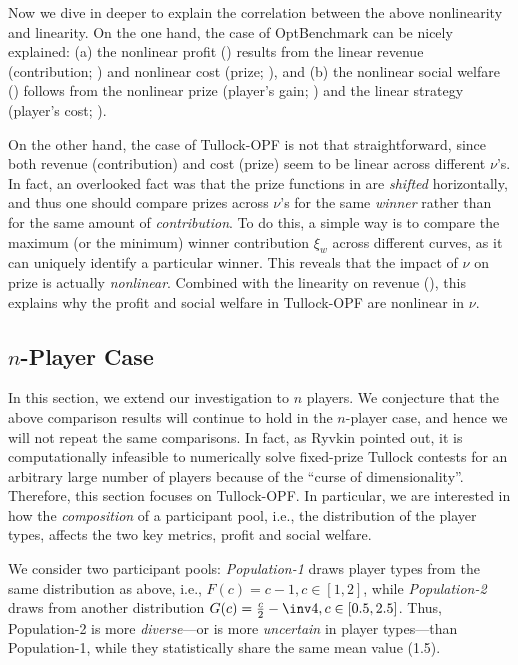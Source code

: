 \documentclass{sig-alternate-10pt}
\begin{document}
Now we dive in deeper to explain the correlation between the above nonlinearity and linearity. On the one hand, the case of OptBenchmark can be nicely explained: (a) the nonlinear profit () results from the linear revenue (contribution; ) and nonlinear cost (prize; ), and (b) the nonlinear social welfare () follows from the nonlinear prize (player's gain; ) and the linear strategy (player's cost; ).

On the other hand, the case of Tullock-OPF is not that straightforward, since both revenue (contribution) and cost (prize) seem to be linear across different $\nu$'s. In fact, an overlooked fact was that the prize functions in  are {\em shifted} horizontally, and thus one should compare prizes across $\nu$'s for the same {\em winner} rather than for the same amount of {\em contribution}. To do this, a simple way is to compare the maximum (or the minimum) winner contribution $\xi_w$ across different curves, as it can uniquely identify a particular winner. This reveals that the impact of $\nu$ on prize is actually {\em nonlinear}. Combined with the linearity on revenue (), this explains why the profit and social welfare in Tullock-OPF are nonlinear in $\nu$. 

\subsection{$n$-Player Case}

In this section, we extend our investigation to $n$ players. We conjecture that the above comparison results will continue to hold in the $n$-player case, and hence we will not repeat the same comparisons. In fact, as Ryvkin \cite{Ryvkin10} pointed out, it is computationally infeasible to numerically solve fixed-prize Tullock contests for an arbitrary large number of players because of the ``curse of dimensionality''. Therefore, this section focuses on Tullock-OPF. In particular, we are interested in how the {\em composition} of a participant pool, i.e., the distribution of the player types, affects the two key metrics, profit and social welfare.

We consider two participant pools: {\it Population-1} draws player types from the same distribution as above, i.e., $F(c)=c-1, c\in[1,2]$, while {\it Population-2} draws from another distribution $G(c)=\frac{c}{2} -\inv 4, c\in[0.5,2.5]$. Thus, Population-2 is more {\em diverse}---or is more {\em uncertain} in player types---than Population-1,
while they statistically share the same mean value (1.5).
\end{document}
